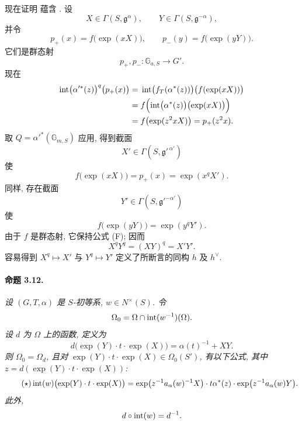 现在证明 \textup{} 蕴含 \textup{}. 设
\[
  X\in\Gamma(S,\mathfrak g^\alpha),
  \qquad
  Y\in\Gamma(S,\mathfrak g^{-\alpha}),
\]
并令
\[
  p_+(x)=f\bigl(\exp(xX)\bigr),
  \qquad
  p_-(y)=f\bigl(\exp(yY)\bigr).
\]
它们是群态射
\[
  p_+,p_-\colon\mathbb G_{a,S}\longrightarrow G'.
\]
现在
\[
\begin{aligned}
  \operatorname{int}\bigl(\alpha'^\ast(z)\bigr)^q\bigl(p_+(x)\bigr)
    &={}\operatorname{int}\bigl(f_T(\alpha^\ast(z))\bigr)
       \bigl(f(\exp(xX))\bigr)\\
    &={}f\Bigl(\operatorname{int}\bigl(\alpha^\ast(z)\bigr)
       \bigl(\exp(xX)\bigr)\Bigr)\\
    &={}f\bigl(\exp(z^2xX)\bigr)
     =p_+(z^2x).
\end{aligned}
\]
取 \(Q=\alpha'^\ast(\mathbb G_{m,S})\) 应用, 得到截面
\[
  X'\in\Gamma(S,\mathfrak g'^{\,\alpha'})
\]
使
\[
  f\bigl(\exp(xX)\bigr)=p_+(x)=\exp(x^qX').
\]
同样, 存在截面
\[
  Y'\in\Gamma(S,\mathfrak g'^{-\alpha'})
\]
使
\[
  f\bigl(\exp(yY)\bigr)=\exp(y^qY').
\]
由于 \(f\) 是群态射, 它保持公式 \textup{(F)}; 因而
\[
  X^qY^q=(XY)^q=X'Y'.
\]
容易得到 \(X^q\mapsto X'\) 与 \(Y^q\mapsto Y'\) 定义了所断言的同构 \(h\) 及 \(h^\vee\).

\paragraph{\textbf{命题 3.12.}}
\emph{设 \((G,T,\alpha)\) 是 \(S\)-初等系, \(w\in N^\times(S)\). 令}
\[
  \Omega_0=\Omega\cap\operatorname{int}(w^{-1})(\Omega).
\]
\emph{设 \(d\) 为 \(\Omega\) 上的函数, 定义为}
\[
  d\bigl(\exp(Y)\cdot t\cdot\exp(X)\bigr)
    =\alpha(t)^{-1}+XY.
\]
\emph{则 \(\Omega_0=\Omega_d\), 且对 \(\exp(Y)\cdot t\cdot\exp(X)\in\Omega_0(S')\), 有以下公式, 其中 \(z=d(\exp(Y)\cdot t\cdot\exp(X))\):}
\begin{equation}
\tag{\(\star\)}\label{sga3:xx:proposition:3-12:equation:star}
  \operatorname{int}(w)\bigl(\exp(Y)\cdot t\cdot\exp(X)\bigr)
  =
  \exp\bigl(z^{-1}a_\alpha(w)^{-1}X\bigr)\cdot
  t\alpha^\ast(z)\cdot
  \exp\bigl(z^{-1}a_\alpha(w)Y\bigr).
\end{equation}
\emph{此外,}
\[
  d\circ\operatorname{int}(w)=d^{-1}.
\]

